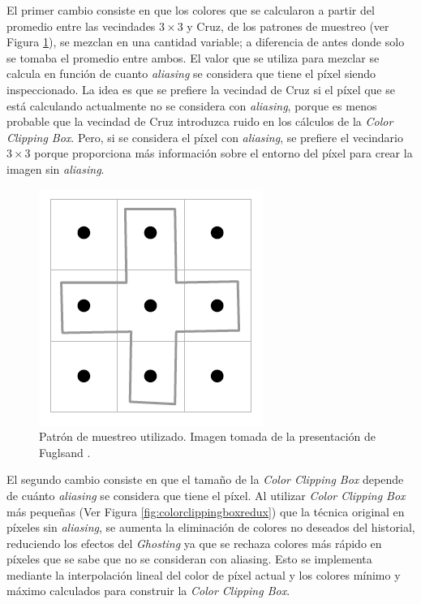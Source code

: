\documentclass[pregrado]{tesis-usb} %
\begin{document}
El primer cambio consiste en que los colores que se calcularon a partir del promedio entre las vecindades $3\times 3$ y Cruz, de los patrones de muestreo (ver Figura \ref{fig:samplingpattern_2}), se mezclan en una cantidad variable; a diferencia de antes donde solo se tomaba el promedio entre ambos. El valor que se utiliza para mezclar se calcula en función de cuanto \textit{aliasing} se considera que tiene el píxel siendo inspeccionado. La idea es que se prefiere la vecindad de Cruz si el píxel que se está calculando actualmente no se considera con \textit{aliasing}, porque es menos probable que la vecindad de Cruz introduzca ruido en los cálculos de la \textit{Color Clipping Box}. Pero, si se considera el píxel con \textit{aliasing}, se prefiere el vecindario $3\times 3$ porque proporciona más información sobre el entorno del píxel para crear la imagen sin \textit{aliasing}. 

\begin{figure}[!hbt]
	\centering
	\includegraphics[scale=0.3]{images/sampling_pattern.png}
	\caption{Patrón de muestreo utilizado. Imagen tomada de la presentación de Fuglsand \protect\cite{Fuglsand2016}.}\label{fig:samplingpattern_2}
\end{figure}

El segundo cambio consiste en que el tamaño de la \textit{Color Clipping Box} depende de cuánto \textit{aliasing} se considera que tiene el píxel. Al utilizar \textit{Color Clipping Box} más pequeñas (Ver Figura \ref{fig:colorclippingboxredux}) que la técnica original en píxeles sin \textit{aliasing}, se aumenta la eliminación de colores no deseados del historial, reduciendo los efectos del \textit{Ghosting} ya que se rechaza colores más rápido en píxeles que se sabe que no se consideran con aliasing. Esto se implementa mediante la interpolación lineal del color de píxel actual y los colores mínimo y máximo calculados para construir la \textit{Color Clipping Box}.
\end{document}

